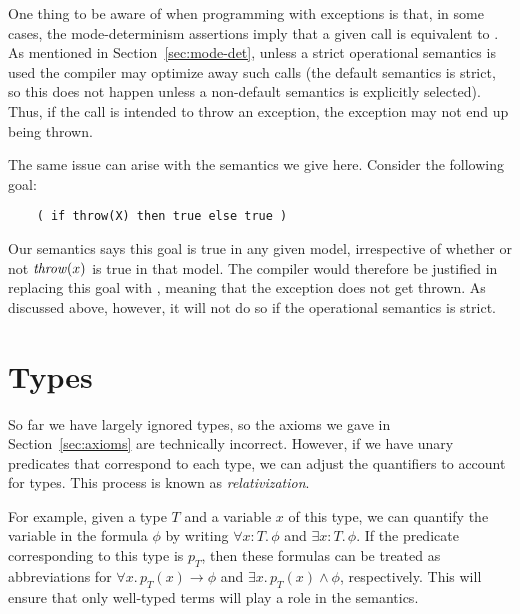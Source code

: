 One thing to be aware of when programming with exceptions
is that, in some cases,
the mode-determinism assertions imply
that a given call is equivalent to .
As mentioned in Section~\ref{sec:mode-det},
unless a strict operational semantics is used
the compiler may optimize away such calls
(the default semantics is strict,
so this does not happen unless
a non-default semantics is explicitly selected).
Thus, if the call is intended to throw an exception,
the exception may not end up being thrown.

The same issue can arise with the semantics we give here.
Consider the following goal:
\begin{verbatim}
    ( if throw(X) then true else true )
\end{verbatim}
Our semantics says this goal is true in any given model,
irrespective of whether or not $\text{\textit{throw}}(x)$
is true in that model.
The compiler would therefore be justified
in replacing this goal with ,
meaning that the exception does not get thrown.
As discussed above, however,
it will not do so if the operational semantics is strict.


\section{Types}
\label{sec:types}

So far we have largely ignored types,
so the axioms we gave in Section~\ref{sec:axioms}
are technically incorrect.
However,
if we have unary predicates that correspond to each type,
we can adjust the quantifiers to account for types.
This process is known as \emph{relativization\label{gi:relativization}}.

For example,
given a type $T$
and a variable $x$ of this type,
we can quantify the variable in the formula $\phi$
by writing $\forall x\!:\!T.\, \phi$ and $\exists x\!:\!T.\, \phi$.
If the predicate corresponding to this type is $p_T$,
then these formulas can be treated as abbreviations for
$\forall x.\, p_T(x) \rightarrow \phi$ and
$\exists x.\, p_T(x) \land \phi$,
respectively.
This will ensure that only well-typed terms
will play a role in the semantics.
